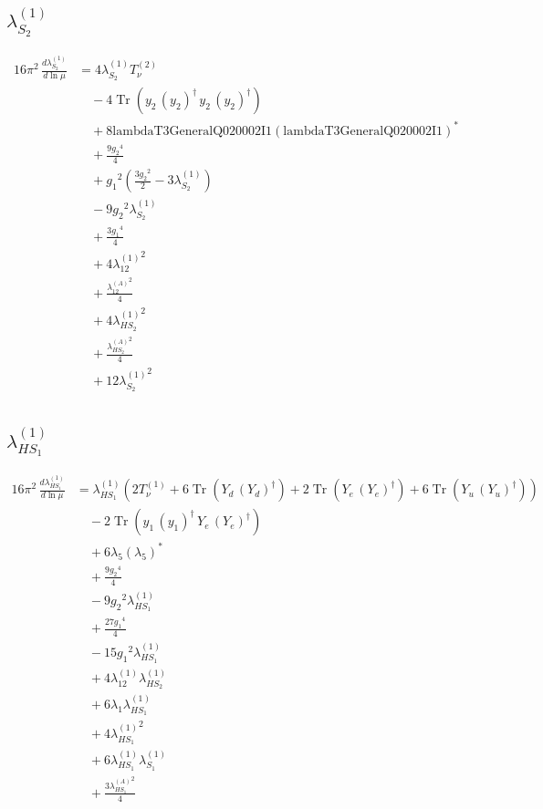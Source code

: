 \documentclass[10pt,a4paper]{article}
\begin{document}
\subsection*{$\lambda_{S_2}^{(1)}$}
\begin{align*}
16\pi^2\,\frac{d \lambda_{S_2}^{(1)}}{d\ln\mu} &=4 {\lambda_{S_2}^{(1)}} T_{\nu}^{(2)} \\
&\quad -4 \operatorname{Tr}\!\left({y_2}\,\left({y_2}\right)^{\dagger}\,{y_2}\,\left({y_2}\right)^{\dagger}\right) \\
&\quad +8 \text{lambdaT3GeneralQ020002I1} \left(\text{lambdaT3GeneralQ020002I1}\right)^{*} \\
&\quad +\frac{9 {g_2}^4}{4} \\
&\quad +{g_1}^2 \left(\frac{3 {g_2}^2}{2}-3 {\lambda_{S_2}^{(1)}}\right) \\
&\quad -9 {g_2}^2 {\lambda_{S_2}^{(1)}} \\
&\quad +\frac{3 {g_1}^4}{4} \\
&\quad +4 {\lambda_{12}^{(1)}}^2 \\
&\quad +\frac{{\lambda_{12}^{(A)}}^2}{4} \\
&\quad +4 {\lambda_{HS_2}^{(1)}}^2 \\
&\quad +\frac{{\lambda_{HS_2}^{(A)}}^2}{4} \\
&\quad +12 {\lambda_{S_2}^{(1)}}^2 \\
\end{align*}
\subsection*{$\lambda_{HS_1}^{(1)}$}
\begin{align*}
16\pi^2\,\frac{d \lambda_{HS_1}^{(1)}}{d\ln\mu} &={\lambda_{HS_1}^{(1)}} (2 T_{\nu}^{(1)}+6 \operatorname{Tr}\!\left({Y_d}\,\left({Y_d}\right)^{\dagger}\right)+2 \operatorname{Tr}\!\left({Y_e}\,\left({Y_e}\right)^{\dagger}\right)+6 \operatorname{Tr}\!\left({Y_u}\,\left({Y_u}\right)^{\dagger}\right)) \\
&\quad -2 \operatorname{Tr}\!\left({y_1}\,\left({y_1}\right)^{\dagger}\,{Y_e}\,\left({Y_e}\right)^{\dagger}\right) \\
&\quad +6 {\lambda_5} \left({\lambda_5}\right)^{*} \\
&\quad +\frac{9 {g_2}^4}{4} \\
&\quad -9 {g_2}^2 {\lambda_{HS_1}^{(1)}} \\
&\quad +\frac{27 {g_1}^4}{4} \\
&\quad -15 {g_1}^2 {\lambda_{HS_1}^{(1)}} \\
&\quad +4 {\lambda_{12}^{(1)}} {\lambda_{HS_2}^{(1)}} \\
&\quad +6 {\lambda_1} {\lambda_{HS_1}^{(1)}} \\
&\quad +4 {\lambda_{HS_1}^{(1)}}^2 \\
&\quad +6 {\lambda_{HS_1}^{(1)}} {\lambda_{S_1}^{(1)}} \\
&\quad +\frac{3 {\lambda_{HS_1}^{(A)}}^2}{4} \\
\end{align*}
\end{document}
